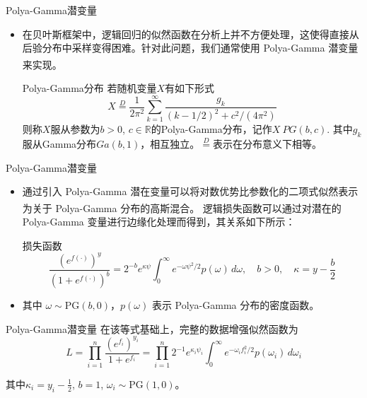 \documentclass{beamer}
\newcommand{\supcite}[1]{\textsuperscript{\cite{#1}}}
\begin{document}
	\begin{frame}{Polya-Gamma潜变量}
		\begin{itemize}[<+->]
			\item 在贝叶斯框架中，逻辑回归的似然函数在分析上并不方便处理，这使得直接从后验分布中采样变得困难。针对此问题，我们通常使用 Polya-Gamma 潜变量来实现\supcite{d}。
			\begin{exampleblock}{Polya-Gamma分布}
				若随机变量$X$有如下形式
				\begin{equation}
					X \overset{D}{=} \dfrac{1}{2\pi^{2}}\sum_{k=1}^{\infty}\dfrac{g_{k}}{(k-1/2)^{2} + c^{2}/(4\pi^{2})
					}
					\label{PG}
				\end{equation}
				则称$X$服从参数为$b>0$, $c\in\mathbb{R}$的Polya-Gamma分布，记作$X~PG(b,c)$. 其中$g_{k}$服从Gamma分布$Ga(b,1)$，相互独立。$\overset{D}{=}$表示在分布意义下相等。
			\end{exampleblock}
		\end{itemize}
	\end{frame}
	\begin{frame}{Polya-Gamma潜变量}
		\begin{itemize}[<+->]
			\item 通过引入 Polya-Gamma 潜在变量可以将对数优势比参数化的二项式似然表示为关于 Polya-Gamma 分布的高斯混合\supcite{d}。
			逻辑损失函数可以通过对潜在的 Polya-Gamma 变量进行边缘化处理而得到，其关系如下所示：
			\begin{exampleblock}{损失函数}
				\begin{equation}
					\frac{(e^{f(\cdot)})^y}{(1 + e^{f(\cdot)})^b} = 2^{-b} e^{\kappa \psi} \int_0^\infty e^{-\omega \psi^2 / 2} p(\omega) \, d\omega,
					\quad b > 0, \quad \kappa = y - \frac{b}{2}
				\end{equation}
			\end{exampleblock}
			\item 其中 \( \omega \sim \text{PG}(b, 0) \)，\( p(\omega) \) 表示 Polya-Gamma 分布的密度函数。
		\end{itemize}
	\end{frame}
	\begin{frame}{Polya-Gamma潜变量}
		在该等式基础上，完整的数据增强似然函数为
		\begin{equation}
			L = \prod_{i=1}^n \frac{(e^{f_i})^{y_i}}{1 + e^{f_i}} 
			= \prod_{i=1}^n 2^{-1} e^{\kappa_i \psi_i} \int_0^\infty e^{-\omega_i f_i^2 / 2} p(\omega_i) \, d\omega_i
		\end{equation}
		
		其中$\kappa_i = y_i - \frac{1}{2}$, $b = 1$, $\omega_i \sim \text{PG}(1, 0)$。
	\end{frame}
\end{document}
